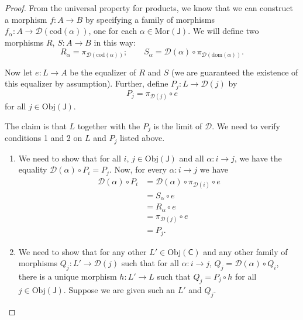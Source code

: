 \documentclass[a4paper,10pt]{scrreprt}
\newcommand{\Obj}{\mathrm{Obj}}
\newcommand{\Mor}{\mathrm{Mor}}
\newcommand{\dom}{\mathrm{dom}}
\newcommand{\cod}{\mathrm{cod}}
\theoremstyle{definition}
\theoremstyle{plain}
\theoremstyle{remark}
\begin{document}
\begin{proof}
  From the universal property for products, we know that we can construct a morphism $f\colon A \to B$ by specifying a family of morphisms $f_{\alpha}\colon A \to \mathcal{D}(\cod(\alpha))$, one for each $\alpha \in \Mor(\mathsf{J})$. We will define two morphisms $R$, $S\colon A \to B$ in this way:
  \begin{equation*}
    R_{\alpha} = \pi_{\mathcal{D}(\cod(\alpha))};\qquad S_{\alpha} = \mathcal{D}(\alpha) \circ \pi_{\mathcal{D}(\dom(\alpha))}.
  \end{equation*}

  Now let $e\colon L \to A$ be the equalizer of $R$ and $S$ (we are guaranteed the existence of this equalizer by assumption). Further, define $P_{j}\colon L \to \mathcal{D}(j)$ by
  \begin{equation*}
    P_{j} = \pi_{\mathcal{D}(j)} \circ e
  \end{equation*}
  for all $j \in \Obj(\mathsf{J})$.

  The claim is that $L$ together with the $P_{j}$ is the limit of $\mathcal{D}$. We need to verify conditions 1 and 2 on $L$ and $P_{j}$ listed above.
  \begin{enumerate}
    \item We need to show that for all $i$, $j \in \Obj(\mathsf{J})$ and all $\alpha\colon i \to j$, we have the equality $\mathcal{D}(\alpha) \circ P_{i} = P_{j}$. Now, for every $\alpha\colon i \to j$ we have
      \begin{align*}
        \mathcal{D}(\alpha) \circ P_{i} &= \mathcal{D}(\alpha) \circ \pi_{\mathcal{D}(i)} \circ e \\
        &= S_{\alpha} \circ e \\
        &= R_{\alpha} \circ e \\
        &= \pi_{\mathcal{D}(j)} \circ e \\
        &= P_{j}.
      \end{align*}

    \item We need to show that for any other $L' \in \Obj(\mathsf{C})$ and any other family of morphisms $Q_{j}\colon L' \to \mathcal{D}(j)$ such that for all $\alpha\colon i \to j$, $Q_{j} = \mathcal{D}(\alpha) \circ Q_{i}$, there is a unique morphism $h\colon L' \to L$ such that $Q_{j} = P_{j} \circ h$ for all $j \in \Obj(\mathsf{J})$. Suppose we are given such an $L'$ and $Q_{j}$.


\end{enumerate}
\end{proof}
\end{document}
